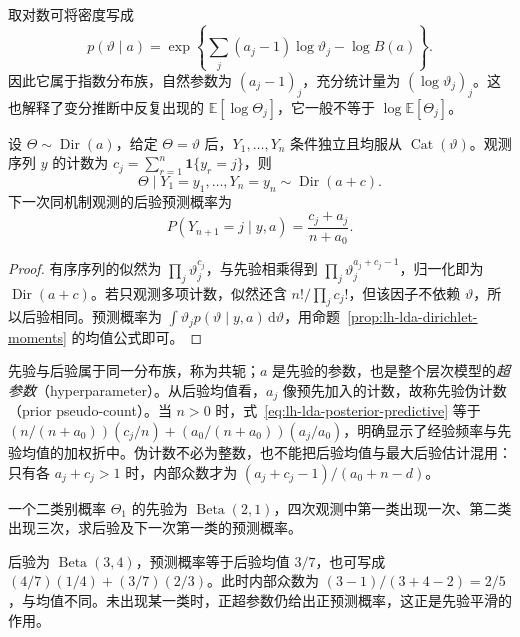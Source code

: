 取对数可将密度写成
\[
p(\vartheta\mid a)
=\exp\left\{\sum_j(a_j-1)\log\vartheta_j-\log B(a)\right\}.
\]
因此它属于指数分布族，自然参数为 $(a_j-1)_j$，充分统计量为 $(\log\vartheta_j)_j$。这也解释了变分推断中反复出现的 $\mathbb E[\log\Theta_j]$，它一般不等于 $\log\mathbb E[\Theta_j]$。

\begin{theorem}[狄利克雷与多项分布的共轭性]
\label{thm:lh-lda-conjugacy}
设 $\Theta\sim\operatorname{Dir}(a)$，给定 $\Theta=\vartheta$ 后，$Y_1,\ldots,Y_n$ 条件独立且均服从 $\operatorname{Cat}(\vartheta)$。观测序列 $y$ 的计数为 $c_j=\sum_{r=1}^n\mathbf1\{y_r=j\}$，则
\begin{equation}
\Theta\mid Y_1=y_1,\ldots,Y_n=y_n\sim\operatorname{Dir}(a+c).
\label{eq:lh-lda-conjugate-posterior}
\end{equation}
下一次同机制观测的后验预测概率为
\begin{equation}
P(Y_{n+1}=j\mid y,a)=\frac{c_j+a_j}{n+a_0}.
\label{eq:lh-lda-posterior-predictive}
\end{equation}
\end{theorem}
\begin{proof}
有序序列的似然为 $\prod_j\vartheta_j^{c_j}$，与先验相乘得到 $\prod_j\vartheta_j^{a_j+c_j-1}$，归一化即为 $\operatorname{Dir}(a+c)$。若只观测多项计数，似然还含 $n!/\prod_jc_j!$，但该因子不依赖 $\vartheta$，所以后验相同。预测概率为 $\int\vartheta_jp(\vartheta\mid y,a)\,\mathrm d\vartheta$，用命题~\ref{prop:lh-lda-dirichlet-moments} 的均值公式即可。
\end{proof}

先验与后验属于同一分布族，称为共轭；$a$ 是先验的参数，也是整个层次模型的\emph{超参数}（hyperparameter）。从后验均值看，$a_j$ 像预先加入的计数，故称先验伪计数（prior pseudo-count）。当 $n>0$ 时，式~\eqref{eq:lh-lda-posterior-predictive} 等于 $(n/(n+a_0))(c_j/n)+(a_0/(n+a_0))(a_j/a_0)$，明确显示了经验频率与先验均值的加权折中。伪计数不必为整数，也不能把后验均值与最大后验估计混用：只有各 $a_j+c_j>1$ 时，内部众数才为 $(a_j+c_j-1)/(a_0+n-d)$。

\begin{example}
\label{ex:lh-lda-beta-update}
一个二类别概率 $\Theta_1$ 的先验为 $\operatorname{Beta}(2,1)$，四次观测中第一类出现一次、第二类出现三次，求后验及下一次第一类的预测概率。
\end{example}
\begin{solve}
后验为 $\operatorname{Beta}(3,4)$，预测概率等于后验均值 $3/7$，也可写成 $(4/7)(1/4)+(3/7)(2/3)$。此时内部众数为 $(3-1)/(3+4-2)=2/5$，与均值不同。未出现某一类时，正超参数仍给出正预测概率，这正是先验平滑的作用。
\end{solve}

